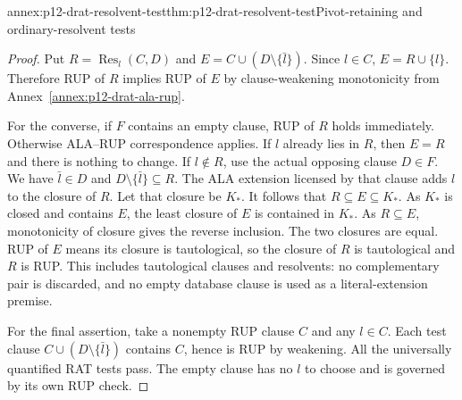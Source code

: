 \begin{annexitem}{annex:p12-drat-resolvent-test}{thm:p12-drat-resolvent-test}{Pivot-retaining and ordinary-resolvent tests}
\begin{proof}
Put \(R=\operatorname{Res}_l(C,D)\) and
\(E=C\cup(D\setminus\{\bar l\})\).  Since \(l\in C\),
\(E=R\cup\{l\}\).  Therefore RUP of \(R\) implies RUP of
\(E\) by clause-weakening monotonicity from
Annex~\ref{annex:p12-drat-ala-rup}.

For the converse, if \(F\) contains an empty clause, RUP of \(R\)
holds immediately.  Otherwise ALA--RUP correspondence applies.  If \(l\)
already lies in \(R\), then \(E=R\) and there is nothing to change.
If \(l\notin R\), use the actual opposing clause \(D\in F\).
We have \(\bar l\in D\) and
\(D\setminus\{\bar l\}\subseteq R\).  The ALA extension licensed
by that clause adds \(l\) to the closure of \(R\).  Let that closure be
\(K_*\).  It follows that \(R\subseteq E\subseteq K_*\).
As \(K_*\) is closed and contains \(E\), the least closure of \(E\)
is contained in \(K_*\).  As \(R\subseteq E\), monotonicity of closure
gives the reverse inclusion.  The two closures are equal.  RUP of \(E\)
means its closure is tautological, so the closure of \(R\) is tautological
and \(R\) is RUP.  This includes tautological clauses and resolvents:
no complementary pair is discarded, and no empty database clause is used as
a literal-extension premise.

For the final assertion, take a nonempty RUP clause \(C\) and any
\(l\in C\).  Each test clause
\(C\cup(D\setminus\{\bar l\})\) contains \(C\), hence is RUP
by weakening.  All the universally quantified RAT tests pass.  The empty
clause has no \(l\) to choose and is governed by its own RUP check.
\end{proof}
\end{annexitem}

